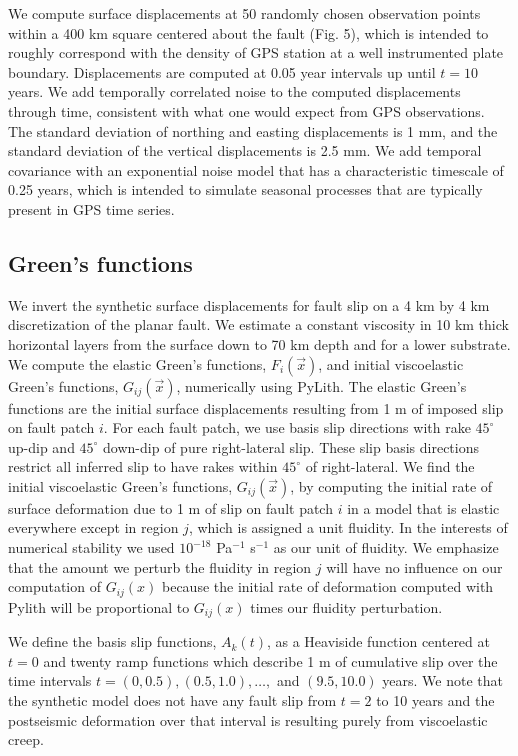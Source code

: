 We compute surface displacements at 50 randomly chosen observation
points within a 400 km square centered about the fault (Fig. 5), which
is intended to roughly correspond with the density of GPS station at a
well instrumented plate boundary.  Displacements are computed at 0.05
year intervals up until $t=10$ years.  We add temporally correlated
noise to the computed displacements through time, consistent with what
one would expect from GPS observations.  The standard deviation of
northing and easting displacements is 1 mm, and the standard deviation
of the vertical displacements is 2.5 mm.  We add temporal covariance
with an exponential noise model that has a characteristic timescale of
0.25 years, which is intended to simulate seasonal processes that are
typically present in GPS time series.

\subsection{Green's functions}\label{GreensFunc}
We invert the synthetic surface displacements for fault slip on a 4 km
by 4 km discretization of the planar fault.  We estimate a constant
viscosity in 10 km thick horizontal layers from the surface down to 70
km depth and for a lower substrate. We compute the elastic Green's
functions, $F_i(\vec{x})$, and initial viscoelastic Green's functions,
$G_{ij}(\vec{x})$, numerically using PyLith.  The elastic Green's
functions are the initial surface displacements resulting from 1 m of
imposed slip on fault patch $i$.  For each fault patch, we use basis
slip directions with rake $45^\circ$ up-dip and $45^\circ$ down-dip of
pure right-lateral slip.  These slip basis directions restrict all
inferred slip to have rakes within $45^\circ$ of right-lateral. We
find the initial viscoelastic Green's functions, $G_{ij}(\vec{x})$, by
computing the initial rate of surface deformation due to 1 m of slip
on fault patch $i$ in a model that is elastic everywhere except in
region $j$, which is assigned a unit fluidity.  In the interests of
numerical stability we used $10^{-18}$ Pa$^{-1}$ s$^{-1}$ as our unit
of fluidity.  We emphasize that the amount we perturb the fluidity in
region $j$ will have no influence on our computation of $G_{ij}(x)$
because the initial rate of deformation computed with Pylith will be
proportional to $G_{ij}(x)$ times our fluidity perturbation.

We define the basis slip functions, $A_k(t)$, as a Heaviside function
centered at $t=0$ and twenty ramp functions which describe 1 m of
cumulative slip over the time intervals $t = (0,0.5), (0.5,1.0),
\dots,$ and $(9.5,10.0)$ years. We note that the synthetic model does
not have any fault slip from $t=2$ to 10 years and the postseismic
deformation over that interval is resulting purely from viscoelastic
creep.

